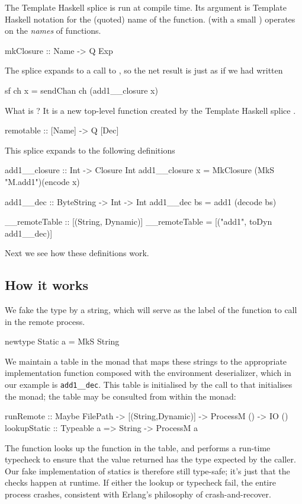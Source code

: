 \documentclass[preprint]{sigplanconf}
\begin{document}
The Template Haskell splice 
is run at compile time.  Its argument  is Template Haskell notation
for the (quoted) name of the  function.  
 (with a small ) operates on the \emph{names} of functions.
\begin{code}
  mkClosure :: Name -> Q Exp
\end{code}
The splice expands to a call to , 
so the net result is just as if we had written
\begin{code}
  sf ch x = sendChan ch (add1__closure x)
\end{code}
What is ?  It is a new top-level function
created by the Template Haskell splice .
\begin{code}
  remotable :: [Name] -> Q [Dec]
\end{code}
This splice expands to the following definitions
\begin{code}
  add1__closure :: Int -> Closure Int
  add1__closure x = MkClosure (MkS "M.add1")(encode x)

  add1__dec :: ByteString -> Int -> Int
  add1__dec bs = add1 (decode bs)

  __remoteTable :: [(String, Dynamic)]
  __remoteTable = [("add1", toDyn add1__dec)]
\end{code}
Next we see how these definitions work.

\subsection{How it works}

We fake the  type by a string, which will serve as the 
label of the function to call in the remote process.
\begin{code}
  newtype Static a = MkS String
\end{code}
We maintain a table in the  monad that maps these strings
to the appropriate implementation function composed with the environment deserializer, which in our example is
\texttt{add1\_\_dec}.
This table is initialised by the call to  that initialises the
 monad; the table may be consulted from within the monad:
\begin{code}
  runRemote    :: Maybe FilePath
                   -> [(String,Dynamic)]
                       -> ProcessM () -> IO ()
  lookupStatic :: Typeable a => String -> ProcessM a
\end{code}
The  function looks up the function in the table,
and performs a run-time typecheck to ensure that the value returned
has the type expected by the caller.  Our fake implementation of
statics is therefore still type-safe; it's just that the checks happen
at runtime.  If either the lookup or typecheck fail, the entire 
process crashes, consistent with Erlang's philosophy of crash-and-recover.
\end{document}
